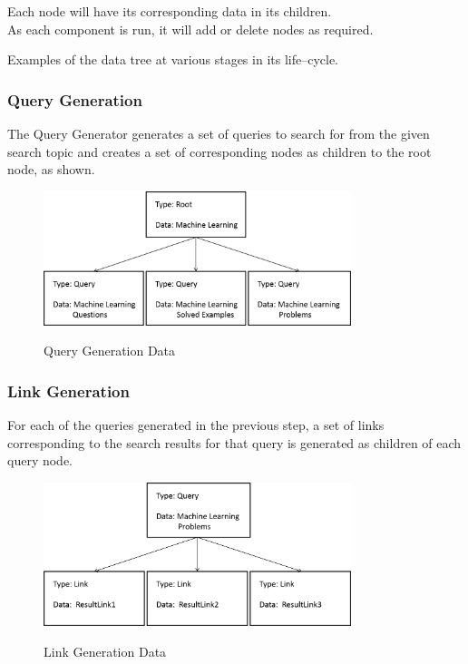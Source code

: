\documentclass[10pt,a4paper]{report}
\begin{document}
Each node will have its corresponding data in its children. \\

As each component is run, it will add or delete nodes as required. \\

\clearpage

Examples of the data tree at various stages in its life--cycle.

\subsubsection{Query Generation}

The Query Generator generates a set of queries to search for from the given search topic and creates a set of corresponding nodes as children to the root node, as shown.

\begin{figure}[h!]
\centering
\includegraphics[width=0.80\textwidth]{./diagrams/tree1}\\
\caption{Query Generation Data}
\end{figure}

\subsubsection{Link Generation}

For each of the queries generated in the previous step, a set of links corresponding to the search results for that query is generated as children of each query node. 

\begin{figure}[h!]
\centering
\includegraphics[width=0.80\textwidth]{./diagrams/tree2}\\
\caption{Link Generation Data}
\end{figure}
\end{document}
